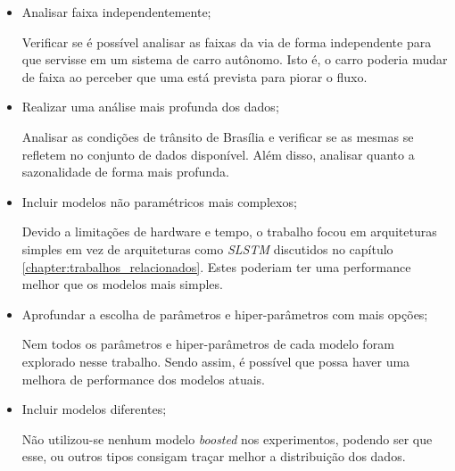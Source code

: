 \begin{itemize}
    \item Analisar faixa independentemente;
    
    Verificar se é possível analisar as faixas da via de forma independente para que servisse em um sistema de carro autônomo. Isto é, o carro poderia mudar de faixa ao perceber que uma está prevista para piorar o fluxo.
    
    \item Realizar uma análise mais profunda dos dados;
    
    Analisar as condições de trânsito de Brasília e verificar se as mesmas se refletem no conjunto de dados disponível. Além disso, analisar quanto a sazonalidade de forma mais profunda.
    
    \item Incluir modelos não paramétricos mais complexos;
    
    Devido a limitações de hardware e tempo, o trabalho focou em arquiteturas simples em vez de arquiteturas como \textit{\acrshort{SLSTM}} discutidos no capítulo \ref{chapter:trabalhos_relacionados}. Estes poderiam ter uma performance melhor que os modelos mais simples.
    
    \item Aprofundar a escolha de parâmetros e hiper-parâmetros com mais opções;
    
    Nem todos os parâmetros e hiper-parâmetros de cada modelo foram explorado nesse trabalho. Sendo assim, é possível que possa haver uma melhora de performance dos modelos atuais.
    
    \item Incluir modelos diferentes;
    
    Não utilizou-se nenhum modelo \textit{boosted} nos experimentos, podendo ser que esse, ou outros tipos consigam traçar melhor a distribuição dos dados.
    
\end{itemize}

